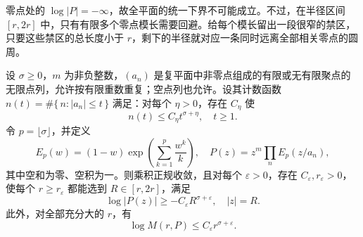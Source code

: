 零点处的 \(\log|P|=-\infty\)，故全平面的统一下界不可能成立。不过，在半径区间 \([r,2r]\) 中，只有有限多个零点模长需要回避。给每个模长留出一段很窄的禁区，只要这些禁区的总长度小于 \(r\)，剩下的半径就对应一条同时远离全部相关零点的圆周。

\begin{lemma}[典范乘积的选圆估计]\label{b3:lem:20-product-circles}
设 \(\sigma\ge0\)，\(m\) 为非负整数，\((a_n)\) 是复平面中非零点组成的有限或无有限聚点的无限点列，允许按有限重数重复；空点列也允许。设其计数函数 \(n(t)=\#\{\,n:|a_n|\le t\,\}\) 满足：对每个 \(\eta>0\)，存在 \(C_\eta\) 使
\[
 n(t)\le C_\eta t^{\sigma+\eta},\quad t\ge1.
\]
令 \(p=\lfloor\sigma\rfloor\)，并定义
\[
 E_p(w)=(1-w)\exp\left(\sum_{k=1}^p\frac{w^k}{k}\right),
 \quad P(z)=z^m\prod_nE_p(z/a_n),
\]
其中空和为零、空积为一。则乘积正规收敛，且对每个 \(\varepsilon>0\)，存在 \(C_\varepsilon,r_\varepsilon>0\)，使每个 \(r\ge r_\varepsilon\) 都能选到 \(R\in[r,2r]\)，满足
\begin{equation}\label{b3:eq:20-circle-lower}
 \log|P(z)|\ge-C_\varepsilon R^{\sigma+\varepsilon},
 \quad |z|=R.
\end{equation}
此外，对全部充分大的 \(r\)，有
\begin{equation}\label{b3:eq:20-product-upper}
 \log M(r,P)\le C_\varepsilon r^{\sigma+\varepsilon}.
\end{equation}
\end{lemma}
